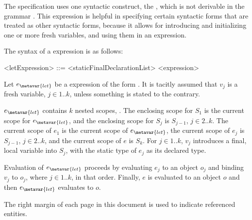 \documentclass[makeidx]{article}
\begin{document}
\LMHash{}%
The specification uses one syntactic construct, the
,
which is not derivable in the grammar
.
This expression is helpful in specifying certain syntactic forms
that are treated as other syntactic forms,
because it allows for introducing and initializing one or more fresh variables,
and using them in an expression.


\LMHash{}%
The syntax of a \LET{} expression is as follows:

\begin{grammar}
<letExpression> ::= \LET{} <staticFinalDeclarationList> \IN{} <expression>
\end{grammar}

\LMHash{}%
%
Let $e_{\metavar{let}}$ be a \LET{} expression of the form
.
It is tacitly assumed that $v_j$ is a fresh variable, $j \in 1 .. k$,
unless something is stated to the contrary.

\LMHash{}%
$e_{\metavar{let}}$ contains $k$ nested scopes, .
The enclosing scope for $S_1$ is the current scope for $e_{\metavar{let}}$,
and the enclosing scope for $S_j$ is $S_{j-1}$, $j \in 2 .. k$.
The current scope of $e_1$ is the current scope of $e_{\metavar{let}}$,
the current scope of $e_j$ is $S_{j-1}$, $j \in 2 .. k$,
and the current scope of $e$ is $S_k$.
For $j \in 1 .. k$, $v_j$ introduces a final, local variable into $S_j$,
with the static type of $e_j$ as its declared type.


\LMHash{}%
Evaluation of $e_{\metavar{let}}$ proceeds by
evaluating $e_j$ to an object $o_j$ and binding $v_j$ to $o_j$,
where $j \in 1 .. k$, in that order.
Finally, $e$ is evaluated to an object $o$ and then
$e_{\metavar{let}}$ evaluates to $o$.

\LMHash{}%
The right margin of each page in this document is used to indicate
referenced entities.
\end{document}
